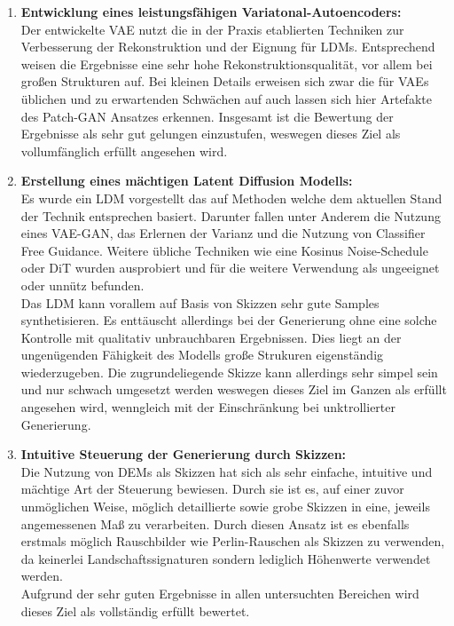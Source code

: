 \begin{enumerate}
    \item \textbf {Entwicklung eines leistungsfähigen Variatonal-Autoencoders:} \\
    Der entwickelte VAE nutzt die in der Praxis etablierten Techniken zur Verbesserung der Rekonstruktion und der Eignung für LDMs. Entsprechend weisen die Ergebnisse eine sehr hohe Rekonstruktionsqualität, vor allem bei großen Strukturen auf. Bei kleinen Details erweisen sich zwar die für VAEs üblichen und zu erwartenden Schwächen auf auch lassen sich hier Artefakte des Patch-GAN Ansatzes erkennen. Insgesamt ist die Bewertung der Ergebnisse als sehr gut gelungen einzustufen, weswegen dieses Ziel als vollumfänglich erfüllt angesehen wird. 
    
    \item \textbf {Erstellung eines mächtigen Latent Diffusion Modells:} \\
    Es wurde ein LDM vorgestellt das auf Methoden welche dem aktuellen Stand der Technik entsprechen basiert. Darunter fallen unter Anderem die Nutzung eines VAE-GAN, das Erlernen der Varianz und die Nutzung von Classifier Free Guidance. Weitere übliche Techniken wie eine Kosinus Noise-Schedule oder DiT wurden ausprobiert und für die weitere Verwendung als ungeeignet oder unnütz befunden. \\
    Das LDM kann vorallem auf Basis von Skizzen sehr gute Samples synthetisieren. Es enttäuscht allerdings bei der Generierung ohne eine solche Kontrolle mit qualitativ unbrauchbaren Ergebnissen. Dies liegt an der ungenügenden Fähigkeit des Modells große Strukuren eigenständig wiederzugeben. Die zugrundeliegende Skizze kann allerdings sehr simpel sein und nur schwach umgesetzt werden weswegen dieses Ziel im Ganzen als erfüllt angesehen wird, wenngleich mit der Einschränkung bei unktrollierter Generierung.

    \item \textbf {Intuitive Steuerung der Generierung durch Skizzen:} \\
    Die Nutzung von DEMs als Skizzen hat sich als sehr einfache, intuitive und mächtige Art der Steuerung bewiesen. Durch sie ist es, auf einer zuvor unmöglichen Weise, möglich detaillierte sowie grobe Skizzen in eine, jeweils angemessenen Maß zu verarbeiten. Durch diesen Ansatz ist es ebenfalls erstmals möglich Rauschbilder wie Perlin-Rauschen als Skizzen zu verwenden, da keinerlei Landschaftssignaturen sondern lediglich Höhenwerte verwendet werden. \\
    Aufgrund der sehr guten Ergebnisse in allen untersuchten Bereichen wird dieses Ziel als vollständig erfüllt bewertet. 


\end{enumerate}
